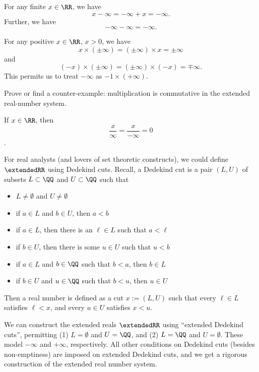 \begin{axiom}[Subtraction]
  For any finite $x\in\RR$, we have
  $$x-\infty=-\infty+x=-\infty.$$
  Further, we have
  $$-\infty-\infty=-\infty.$$
\end{axiom}


\begin{axiom}[Multiplication]
  For any positive $x\in\RR$, $x>0$, we have
  $$x\times(\pm\infty)=(\pm\infty)\times x = \pm\infty$$
  and
  $$(-x)\times(\pm\infty)=(\pm\infty)\times(-x)=\mp\infty.$$
  This permits us to treat $-\infty$ as $-1\times(+\infty)$.
\end{axiom}


\begin{xca}
  Prove or find a counter-example: multiplication is commutative in the
  extended real-number system.
\end{xca}


\begin{axiom}[Division]
  If $x\in\RR$, then
  $$\frac{x}{\infty}=\frac{x}{-\infty}=0$$.
\end{axiom}

\begin{rmk}
For real analysts (and lovers of set theoretic constructs), we could
define $\extendedRR$ using Dedekind cuts. Recall, a Dedekind cut is a
pair $(L,U)$ of subsets $L\subset\QQ$ and $U\subset\QQ$ such that
\begin{itemize}
\item $L\neq\emptyset$ and $U\neq\emptyset$
\item if $a\in L$ and $b\in U$, then $a<b$
\item if $a\in L$, then there is an $\ell\in L$ such that $a < \ell$
\item if $b\in U$, then there is some $u\in U$ such that $u < b$
\item if $a\in L$ and $b\in\QQ$ such that $b < a$, then $b\in L$
\item if $b\in U$ and $u\in\QQ$ such that $b < u$, then $u\in U$
\end{itemize}
Then a real number is defined as a cut $x := (L,U)$ such that every
$\ell\in L$ satisfies $\ell < x$, and every $u\in U$ satisfies $x < u$.

We can construct the extended reals $\extendedRR$ using ``extended
Dedekind cuts'', permitting (1) $L=\emptyset$ and $U=\QQ$, and (2)
$L=\QQ$ and $U=\emptyset$. These model $-\infty$ and $+\infty$,
respectively. All other conditions on Dedekind cuts (besides
non-emptiness) are imposed on extended Dedekind cuts, and we get a
rigorous construction of the extended real number system.
\end{rmk}


